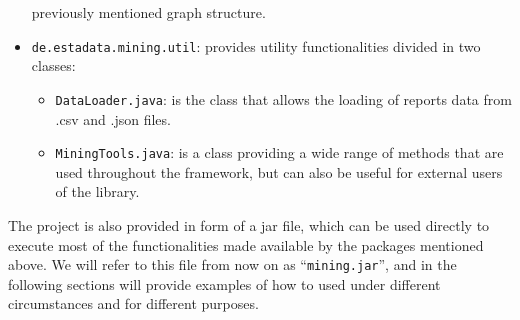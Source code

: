 \documentclass{article}
\begin{document}
\begin{itemize}
				previously mentioned graph structure.
			\item \texttt{de.estadata.mining.util}: provides utility functionalities divided in two classes:
			\begin{itemize}
				\item \texttt{DataLoader.java}: is the class that allows the loading of reports data from .csv and .json files.
				\item \texttt{MiningTools.java}: is a class providing a wide range of methods that are used throughout the 
					framework, but can also be useful for external users of the library.
			\end{itemize}
		\end{itemize}
		
		The project is also provided in form of a jar file, which can be used directly to execute most
		of the functionalities made available by the packages mentioned above. We will refer to this
		file from now on as ``\texttt{mining.jar}'', and in the following sections will provide examples
		of how to used under different circumstances and for different purposes.
	
\end{document}
